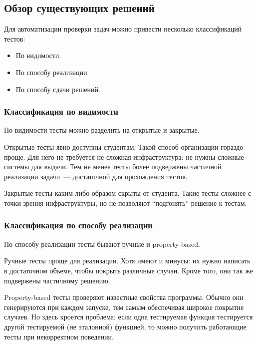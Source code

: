 
\subsection{Обзор существующих решений}
\label{subsec:types}

Для автоматизации проверки задач можно привести несколько классификаций тестов:
\begin{itemize}
    \item По видимости.
    \item По способу реализации.
    \item По способу сдачи решений.
\end{itemize}

\subsubsection{Классификация по видимости}

По видимости тесты можно разделить на открытые и закрытые.

Открытые тесты явно доступны студентам.
Такой способ организации гораздо проще.
Для него не требуется не сложная инфраструктура: не нужны сложные системы для выдачи.
Тем не менее тесты более подвержены частичной реализации задачи~--- достаточной для прохождения тестов.

Закрытые тесты каким-либо образом скрыты от студента.
Такие тесты сложнее с точки зрения инфраструктуры, но не позволяют \enquote{подгонять} решение к тестам.

\subsubsection{Классификация по способу реализации}

По способу реализации тесты бывают ручные и property-based.

Ручные тесты проще для реализации.
Хотя имеют и минусы: их нужно написать в достаточном объеме, чтобы покрыть различные случаи.
Кроме того, они так же подвержены частичному решению.

Property-based тесты проверяют известные свойства программы.
Обычно они генерируются при каждом запуске, тем самым обеспечивая широкое покрытие случаев.
Но здесь кроется проблема: если одна тестируемая функция тестируется другой тестируемой (не эталонной) функцией, то можно получить работающие тесты при некорректном поведении.

